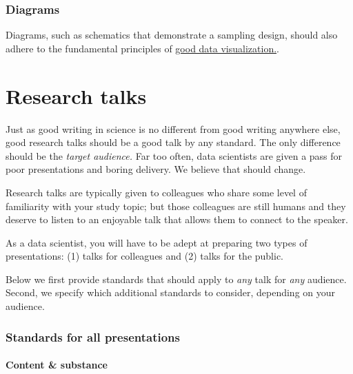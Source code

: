 \documentclass[
]{book}
\begin{document}
\hypertarget{diagrams}{%
\subsection*{Diagrams}\label{diagrams}}

Diagrams, such as schematics that demonstrate a sampling design, should also adhere to the fundamental principles of \protect\hyperlink{datavis}{good data visualization.}.

\hypertarget{research-talks}{%
\chapter{Research talks}\label{research-talks}}

Just as good writing in science is no different from good writing anywhere else, good research talks should be a good talk by any standard. The only difference should be the \emph{target audience.} Far too often, data scientists are given a pass for poor presentations and boring delivery. We believe that should change.

Research talks are typically given to colleagues who share some level of familiarity with your study topic; but those colleagues are still humans and they deserve to listen to an enjoyable talk that allows them to connect to the speaker.

As a data scientist, you will have to be adept at preparing two types of presentations: (1) talks for colleagues and (2) talks for the public.

Below we first provide standards that should apply to \emph{any} talk for \emph{any} audience. Second, we specify which additional standards to consider, depending on your audience.

\hypertarget{standards-for-all-presentations}{%
\subsection*{Standards for all presentations}\label{standards-for-all-presentations}}

\hypertarget{content-substance}{%
\subsubsection*{Content \& substance}\label{content-substance}}
\end{document}
